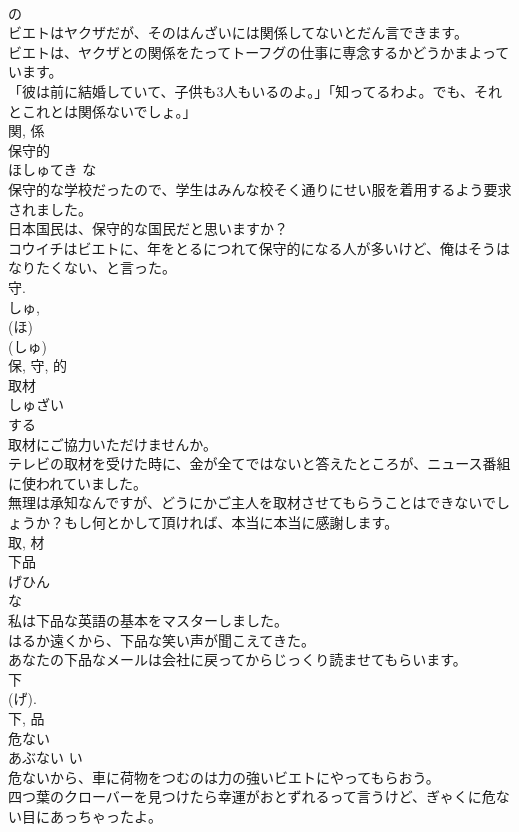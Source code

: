 \documentclass[8pt]{extreport}
\begin{document}
\begin{CJK}{UTF8}{min}
\\	の 
\\	ビエトはヤクザだが、そのはんざいには関係してないとだん言できます。	
\\	ビエトは、ヤクザとの関係をたってトーフグの仕事に専念するかどうかまよっています。	
\\	「彼は前に結婚していて、子供も3人もいるのよ。」「知ってるわよ。でも、それとこれとは関係ないでしょ。」	
\\	関, 係	
\\	保守的	
\\	ほしゅてき	な 
\\	保守的な学校だったので、学生はみんな校そく通りにせい服を着用するよう要求されました。	
\\	日本国民は、保守的な国民だと思いますか？	
\\	コウイチはビエトに、年をとるにつれて保守的になる人が多いけど、俺はそうはなりたくない、と言った。	
\\	守. 
\\	しゅ, 
\\	(ほ) 
\\	(しゅ) 
\\	保, 守, 的	
\\	取材	
\\	しゅざい	
\\	する 
\\	取材にご協力いただけませんか。	
\\	テレビの取材を受けた時に、金が全てではないと答えたところが、ニュース番組に使われていました。	
\\	無理は承知なんですが、どうにかご主人を取材させてもらうことはできないでしょうか？もし何とかして頂ければ、本当に本当に感謝します。	
\\	取, 材	
\\	下品	
\\	げひん	
\\	な 
\\	私は下品な英語の基本をマスターしました。	
\\	はるか遠くから、下品な笑い声が聞こえてきた。	
\\	あなたの下品なメールは会社に戻ってからじっくり読ませてもらいます。	
\\	下 
\\	(げ). 
\\	下, 品	
\\	危ない	
\\	あぶない	い 
\\	危ないから、車に荷物をつむのは力の強いビエトにやってもらおう。	
\\	四つ葉のクローバーを見つけたら幸運がおとずれるって言うけど、ぎゃくに危ない目にあっちゃったよ。	

\end{CJK}
\end{document}
